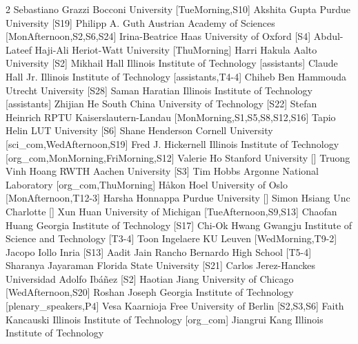 \documentclass[12pt,lettersize,oneside]{book} %
\begin{document}
\begin{multicols}{2}
\participantne
  {Sebastiano Grazzi}
  {Bocconi University}
  [TueMorning,S10]
\participantne
  {Akshita Gupta}
  {Purdue University}
  [S19]
\participantne
  {Philipp A. Guth}
  {Austrian Academy of Sciences}
  [MonAfternoon,S2,S6,S24]
\participantne
  {Irina-Beatrice Haas}
  {University of Oxford}
  [S4]
\participantne
  {Abdul-Lateef Haji-Ali}
  {Heriot-Watt University}
  [ThuMorning]
\participantne
  {Harri Hakula}
  {Aalto University}
  [S2]
\participantne
  {Mikhail Hall}
  {Illinois Institute of Technology}
  [assistants]
\participantne
  {Claude Hall Jr.}
  {Illinois Institute of Technology}
  [assistants,T4-4]
\participantne
  {Chiheb Ben Hammouda}
  {Utrecht University}
  [S28]
\participantne
  {Saman Haratian}
  {Illinois Institute of Technology}
  [assistants]
\participantne
  {Zhijian He}
  {South China University of Technology}
  [S22]
\participantne
  {Stefan Heinrich}
  {RPTU Kaiserslautern-Landau}
  [MonMorning,S1,S5,S8,S12,S16]
\participantne
  {Tapio Helin}
  {LUT University}
  [S6]
\participantne
  {Shane Henderson}
  {Cornell University}
  [sci_com,WedAfternoon,S19]
\participantne
  {Fred J. Hickernell}
  {Illinois Institute of Technology}
  [org_com,MonMorning,FriMorning,S12]
\participantne
  {Valerie Ho}
  {Stanford University}
  []
\participantne
  {Truong Vinh Hoang}
  {RWTH Aachen University}
  [S3]
\participantne
  {Tim Hobbs}
  {Argonne National Laboratory}
  [org_com,ThuMorning]
\participantne
  {H{\aa}kon Hoel}
  {University of Oslo}
  [MonAfternoon,T12-3]
\participantne
  {Harsha Honnappa}
  {Purdue University}
  []
\participantne
  {Simon Hsiang}
  {Unc Charlotte}
  []
\participantne
  {Xun Huan}
  {University of Michigan}
  [TueAfternoon,S9,S13]
\participantne
  {Chaofan Huang}
  {Georgia Institute of Technology}
  [S17]
\participantne
  {Chi-Ok Hwang}
  {Gwangju Institute of Science and Technology}
  [T3-4]
\participantne
  {Toon Ingelaere}
  {KU Leuven}
  [WedMorning,T9-2]
\participantne
  {Jacopo Iollo}
  {Inria}
  [S13]
\participantne
  {Aadit Jain}
  {Rancho Bernardo High School}
  [T5-4]
\participantne
  {Sharanya Jayaraman}
  {Florida State University}
  [S21]
\participantne
  {Carlos Jerez-Hanckes}
  {Universidad Adolfo Ib\'a\~nez}
  [S2]
\participantne
  {Haotian Jiang}
  {University of Chicago}
  [WedAfternoon,S20]
\participantne
  {Roshan Joseph}
  {Georgia Institute of Technology}
  [plenary_speakers,P4]
\participantne
  {Vesa Kaarnioja}
  {Free University of Berlin}
  [S2,S3,S6]
\participantne
  {Faith Kancauski}
  {Illinois Institute of Technology}
  [org_com]
\participantne
  {Jiangrui Kang}
  {Illinois Institute of Technology}

\end{multicols}
\end{document}
